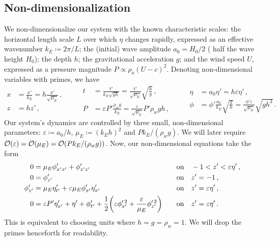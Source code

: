\documentclass{jfm}
\renewcommand*{\epsilon}{\varepsilon}
\begin{document}
\subsection{\label{sec:nondim} Non-dimensionalization}
We non-dimensionalize our system with the known characteristic
scales: the horizontal length scale $L$ over which $\eta$ changes
rapidly, expressed as an effective wavenumber $k_E \coloneqq 2 \pi/L$;
the (initial) wave amplitude $a_0 = H_0/2$ (\ie{} half the wave height
$H_0$); the depth $h$; the gravitational acceleration $g$; and the wind
speed $U$, expressed as a pressure magnitude $P \propto \rho_a (U-c)^2$.
Denoting non-dimensional variables with primes, we have
\begin{equation}
  \begin{aligned}
  x &= \frac{x'}{k_E} = h \frac{x'}{\sqrt{\mu_E}}\,, \\
  z &= h z' \,,
  \end{aligned}
  \qquad
  \begin{aligned}
  t &= \frac{t'}{k_E\sqrt{g h}}
    = \frac{t'}{\sqrt{\mu_E}} \sqrt{\frac{h}{g}} \,, \\
  P &= \epsilon P' \frac{\rho_w g}{k_E}
    = \frac{\epsilon}{\sqrt{\mu_E}} P' \rho_w g h \,,
  \end{aligned}
  \qquad
  \begin{aligned}
  \eta &= a_0 \eta' = h \epsilon \eta' \,, \\
  \phi &= \phi'\frac{a_0}{k_E}\sqrt{\frac{g}{h}}
    = \frac{\phi'\epsilon}{\sqrt{\mu_E}}\sqrt{g h^3} \,.
  \end{aligned}
\end{equation}
Our system's dynamics are controlled by three small, non-dimensional
parameters: $\epsilon \coloneqq a_0/h$, $\mu_E \coloneqq (k_E h)^2$ and
$P k_E/(\rho_w g)$.
We will later require $\order{\epsilon} = \order{\mu_E} =
\order{Pk_E/(\rho_w g)}$.
Now, our non-dimensional equations take the form
\begin{alignat}{2}
  0 &= \mu_E \phi'_{x'x'} + \phi'_{z'z'} &&\qq{on}
    -1 < z' < \epsilon \eta' \,, \label{eq:laplace_nondim} \\
  0 &= \phi'_{z'} &&\qq{on} z'=-1 \,, \label{eq:bottom_bc_nondim} \\
  \phi'_{z'} &= \mu_E \eta'_{t'} +
    \epsilon \mu_E \phi'_{x'} \eta'_{x'} &&\qq{on} z' = \epsilon \eta' \,,
    \label{eq:kinematic_bc_nondim} \\
  0 &= \epsilon P' \eta'_{x'} +  \eta' + \phi'_{t'} + \frac{1}{2}
    \pqty{\epsilon \phi_{x'}^{\prime \, 2} + \frac{\epsilon}{\mu_E}
    \phi_{z'}^{\prime \, 2}} &&\qq{on} z'= \epsilon \eta' \,.
    \label{eq:dynamic_bc_nondim}
\end{alignat}
This is equivalent to choosing units where $h = g = \rho_w = 1$.
We will drop the primes henceforth for readability.
\end{document}
